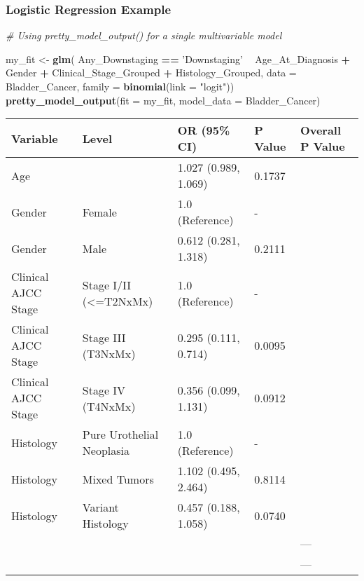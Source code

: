 \documentclass[table]{article}
\newenvironment{Shaded}{\begin{snugshade}}{\end{snugshade}}
\newcommand{\CommentTok}[1]{\textcolor[rgb]{0.56,0.35,0.01}{\textit{#1}}}
\newcommand{\DataTypeTok}[1]{\textcolor[rgb]{0.13,0.29,0.53}{#1}}
\newcommand{\KeywordTok}[1]{\textcolor[rgb]{0.13,0.29,0.53}{\textbf{#1}}}
\newcommand{\NormalTok}[1]{#1}
\newcommand{\OperatorTok}[1]{\textcolor[rgb]{0.81,0.36,0.00}{\textbf{#1}}}
\newcommand{\StringTok}[1]{\textcolor[rgb]{0.31,0.60,0.02}{#1}}
\begin{document}
\clearpage

\hypertarget{logistic-regression-example}{%
\subsubsection{Logistic Regression
Example}\label{logistic-regression-example}}

\begin{Shaded}
\begin{Highlighting}[]
\CommentTok{# Using pretty_model_output() for a single multivariable model}

\NormalTok{my_fit <-}\StringTok{ }\KeywordTok{glm}\NormalTok{(}
\NormalTok{  Any_Downstaging }\OperatorTok{==}\StringTok{ 'Downstaging'} \OperatorTok{~}\StringTok{ }\NormalTok{Age_At_Diagnosis }\OperatorTok{+}\StringTok{ }\NormalTok{Gender }\OperatorTok{+}\StringTok{ }\NormalTok{Clinical_Stage_Grouped }\OperatorTok{+}\StringTok{ }
\StringTok{    }\NormalTok{Histology_Grouped, }\DataTypeTok{data =}\NormalTok{ Bladder_Cancer, }\DataTypeTok{family =} \KeywordTok{binomial}\NormalTok{(}\DataTypeTok{link =} \StringTok{"logit"}\NormalTok{))}
\KeywordTok{pretty_model_output}\NormalTok{(}\DataTypeTok{fit =}\NormalTok{ my_fit, }\DataTypeTok{model_data =}\NormalTok{ Bladder_Cancer)}
\end{Highlighting}
\end{Shaded}

\begin{tabular}{l|l|l|l|l}
\hline
Variable & Level & OR (95\% CI) & P Value & Overall P Value\\
\hline
Age &  & 1.027 (0.989, 1.069) & 0.1737 & \\
\hline
Gender & Female & 1.0 (Reference) & - & \\
\hline
Gender & Male & 0.612 (0.281, 1.318) & 0.2111 & \\
\hline
Clinical AJCC Stage & Stage I/II (<=T2NxMx) & 1.0 (Reference) & - & \\
\hline
Clinical AJCC Stage & Stage III (T3NxMx) & 0.295 (0.111, 0.714) & 0.0095 & \\
\hline
Clinical AJCC Stage & Stage IV (T4NxMx) & 0.356 (0.099, 1.131) & 0.0912 & \\
\hline
Histology & Pure Urothelial Neoplasia & 1.0 (Reference) & - & \\
\hline
Histology & Mixed Tumors & 1.102 (0.495, 2.464) & 0.8114 & \\
\hline
Histology & Variant Histology & 0.457 (0.188, 1.058) & 0.0740 & \\
\hline
 &  &  &  & ---\\
\hline
 &  &  &  & ---\\
\hline
\end{tabular}
\end{document}
